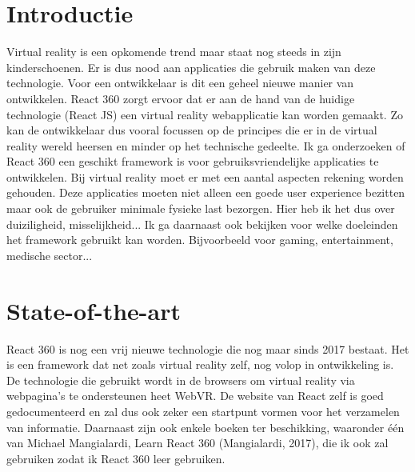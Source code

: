 
\section{Introductie} %
\label{sec:introductie}

Virtual reality is een opkomende trend maar staat nog steeds in zijn kinderschoenen. Er is dus nood aan applicaties die gebruik maken van deze technologie. Voor een ontwikkelaar is dit een geheel nieuwe manier van ontwikkelen. React 360 zorgt ervoor dat er aan de hand van de huidige technologie (React JS) een virtual reality webapplicatie kan worden gemaakt. Zo kan de ontwikkelaar dus vooral focussen op de principes die er in de virtual reality wereld heersen en minder op het technische gedeelte. Ik ga onderzoeken of React 360 een geschikt framework is voor gebruiksvriendelijke applicaties te ontwikkelen. Bij virtual reality moet er met een aantal aspecten rekening worden gehouden. Deze applicaties moeten niet alleen een goede user experience bezitten maar ook de gebruiker minimale fysieke last bezorgen. Hier heb ik het dus over duiziligheid, misselijkheid... Ik ga daarnaast ook bekijken voor welke doeleinden het framework gebruikt kan worden. Bijvoorbeeld voor gaming, entertainment, medische sector...


\section{State-of-the-art}
\label{sec:state-of-the-art}

React 360 is nog een vrij nieuwe technologie die nog maar sinds 2017 bestaat. Het is een framework dat net zoals virtual reality zelf, nog volop in ontwikkeling is. De technologie die gebruikt wordt in de browsers om virtual reality via webpagina's te ondersteunen heet WebVR. De website van React zelf is goed gedocumenteerd en zal dus ook zeker een startpunt vormen voor het verzamelen van informatie. Daarnaast zijn ook enkele boeken ter beschikking, waaronder één van Michael Mangialardi, Learn React 360 (Mangialardi, 2017), die ik ook zal gebruiken zodat ik React 360 leer gebruiken.

